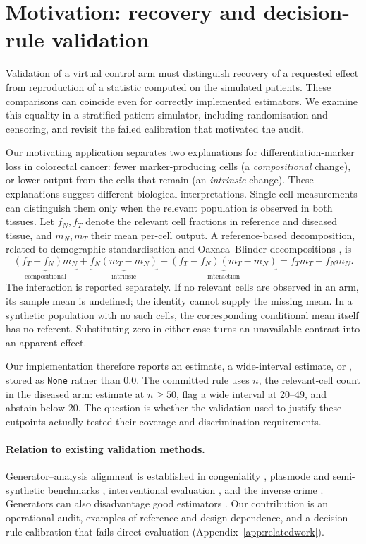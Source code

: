 \section{Motivation: recovery and decision-rule validation}
\label{sec:intro}

Validation of a virtual control arm must distinguish recovery of a requested
effect from reproduction of a statistic computed on the simulated patients.
These comparisons can coincide even for correctly implemented estimators.
We examine this equality in a stratified patient simulator, including
randomisation and censoring, and revisit the failed calibration that motivated
the audit.

Our motivating application separates two explanations for differentiation-marker
loss in colorectal cancer: fewer marker-producing cells (a \emph{compositional}
change), or lower output from the cells that remain (an \emph{intrinsic}
change). These explanations suggest different biological interpretations.
Single-cell measurements can distinguish them only when the relevant population
is observed in both tissues. Let $f_N,f_T$ denote the relevant cell fractions
in reference and diseased tissue, and $m_N,m_T$ their mean per-cell output.
A reference-based decomposition, related to demographic standardisation and
Oaxaca--Blinder decompositions \citep{kitagawa1955,oaxaca1973,blinder1973}, is
\begin{equation}
\underbrace{(f_T-f_N)m_N}_{\text{compositional}} +
\underbrace{f_N(m_T-m_N)}_{\text{intrinsic}} +
\underbrace{(f_T-f_N)(m_T-m_N)}_{\text{interaction}}
= f_Tm_T-f_Nm_N.
\label{eq:kitagawa}
\end{equation}
The interaction is reported separately. If no relevant cells are observed in
an arm, its sample mean is undefined; the identity cannot supply the missing
mean. In a synthetic population with no such cells, the corresponding
conditional mean itself has no referent. Substituting zero in either case
turns an unavailable contrast into an apparent effect.

Our implementation therefore reports an estimate, a wide-interval estimate, or
\notest{}, stored as \texttt{None} rather than $0.0$. The committed rule uses
$n$, the relevant-cell count in the diseased arm: estimate at $n\geq50$, flag a
wide interval at 20--49, and abstain below 20. The question is whether the
validation used to justify these cutpoints actually tested their coverage and
discrimination requirements.

\paragraph{Relation to existing validation methods.}
Generator--analysis alignment is established in congeniality
\citep{meng1994}, plasmode and semi-synthetic benchmarks
\citep{franklin2014,curth2021}, interventional evaluation
\citep{gentzel2019}, and the inverse crime \citep{wirgin2004,kaipio2007}.
Generators can also disadvantage good estimators \citep{shaw2026}.
Our contribution is an operational audit, examples of reference and design
dependence, and a decision-rule calibration that fails direct evaluation
(Appendix~\ref{app:relatedwork}).


